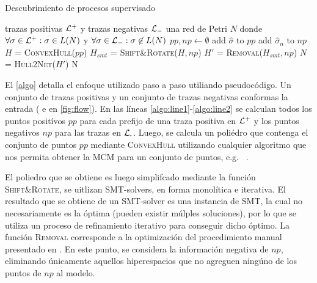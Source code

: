 \begin{algorithm}[h]
\caption{Descubrimiento de procesos supervisado}
  \begin{algorithmic}[1]
      \Require trazas positivas ${\mathcal L}^+$ y trazas negativas ${\mathcal L}_-$
      \Ensure una red de Petri $N$ donde $\forall \sigma \in {\mathcal L}^+: \sigma \in L(N)$ y $\forall \sigma \in {\mathcal L}_-: \sigma \not \in L(N)$
      \vspace{1mm}
      \State $pp, np \leftarrow \emptyset$ \label{algo:line1}
          \State add $\widehat\sigma$ to $pp$
       \EndFor
     \EndFor
        \State add $\widehat\sigma_n$ to $np$
      \EndFor \label{algo:line2}
      \State $H$ = \textsc{ConvexHull}($pp$) \label{algo:lineqhull}
      \State $H_{smt}$ = \textsc{Shift\&Rotate}($H, np$)
      \State $H'$ = \textsc{Removal}($H_{smt}, np$)
      \State $N$ = \textsc{Hull2Net}($H'$)
      \State \Return N
      \EndProcedure
  \end{algorithmic}
  \label{algo}
\end{algorithm}

El \autoref{algo} detalla el enfoque utilizado paso a paso utiliando pseudocódigo. Un conjunto de trazas 
positivas y un conjunto de trazas negativas conformas la entrada ( e  en \autoref{fig:flow}). 
En las líneas \ref{algo:line1}-\ref{algo:line2} se calculan todos los puntos positívos $pp$ para
cada prefijo de una traza positiva en ${\mathcal L}\textsuperscript{+}$ y los puntos negativos $np$ para las trazas en ${\mathcal L}\textsubscript{-}$\footnotemark[1].
Luego, se calcula un poliédro que contenga el conjunto de puntos $pp$ mediante \textsc{ConvexHull} utilizando 
cualquier algoritmo que nos permita obtener la MCM para un conjunto de puntos, e.g. \qhulltool~\cite{Barber96}.

El poliedro que se obtiene es luego simplifcado mediante la función \textsc{Shift\&Rotate}, se uitlizan SMT-solvers,
en forma monolítica e iterativa. El resultado que se obtiene de un SMT-solver es una instancia de SMT, la cual
no necesariamente es la óptima (pueden existir múlples soluciones), por lo que se utiliza un proceso de refinamiento
iterativo para conseguir dicho óptimo.
La función \textsc{Removal} corresponde a la optimización del procedimiento manual presentado en \cite{CarmonaC14}.
En este punto, se considera la información negativa de $np$, eliminando únicamente aquellos hiperespacios
que no agreguen ningúno de los puntos de $np$ al modelo.

